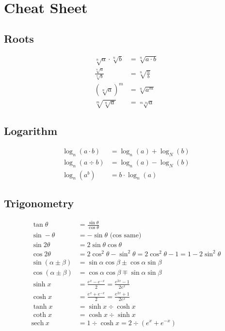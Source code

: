 \section{Cheat Sheet}
\subsection{Roots}

\begin{align*}
	\sqrt[n]{a}\cdot\sqrt[n]{b} & = \sqrt[n]{a\cdot b} \\
	\frac{\sqrt[n]{a}}{\sqrt[n]{b}} & = \sqrt[n]{\frac{a}{b}} \\
	(\sqrt[n]{a})^m & = \sqrt[n]{a^m} \\
	\sqrt[m]{\sqrt[n]{a}} & = \sqrt[m\cdot n]{a}
\end{align*}


\subsection{Logarithm}

\begin{align*}
	\log_n(a\cdot b) & = \log_n(a) + \log_N(b) \\
	\log_n(a\div b) & = \log_n(a) - \log_N(b) \\
	\log_n(a^b) & = b \cdot \log_n(a)
\end{align*}

\subsection{Trigonometry}

\begin{align*}
	\tan\theta & = \frac{\sin\theta}{\cos\theta} \\
	\sin -\theta & = -\sin\theta\text{ (cos same)} \\
	\sin 2\theta & = 2\sin\theta\cos\theta \\
	\cos 2\theta & = 2\cos^2\theta - \sin^2\theta = 2\cos^2\theta - 1 = 1 - 2\sin^2\theta \\
	\sin(\alpha \pm \beta) & = \sin\alpha\cos\beta\pm\cos\alpha\sin\beta \\
	\cos(\alpha\pm\beta) & = \cos\alpha\cos\beta \mp \sin\alpha\sin\beta \\
	\sinh x & = \frac{e^x - e^{-x}}{2}=\frac{e^{2x}-1}{2e^x} \\
	\cosh x & = \frac{e^x + e^{-x}}{2} = \frac{e^{2x}+1}{2e^x} \\
	\tanh x & = \sinh x \div \cosh x \\
	\coth x & = \cosh x \div \sinh x \\
	\mathrm{sech}\ x & = 1 \div \cosh x = 2 \div (e^x+e^{-x})
\end{align*}

